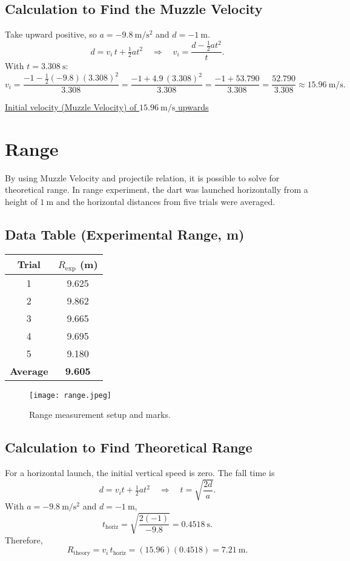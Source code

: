 \documentclass[12pt]{article}
\begin{document}
\subsection{Calculation to Find the Muzzle Velocity}
Take upward positive, so $a=-9.8~\mathrm{m/s^2}$ and $d=-1~\mathrm{m}$.
\[
d = v_i\, t + \tfrac{1}{2} a t^2 \quad \Rightarrow \quad
v_i = \frac{d - \tfrac{1}{2} a t^2}{t}.
\]
With $t=3.308~\mathrm{s}$:
\[
v_i = \frac{-1 - \tfrac{1}{2}(-9.8)(3.308)^2}{3.308}
= \frac{-1 + 4.9\,(3.308)^2}{3.308}
= \frac{-1 + 53.790}{3.308}
= \frac{52.790}{3.308}
\approx \boxed{15.96~\mathrm{m/s}}.
\]
\vspace{1em}

\noindent\hfill\underline{Initial velocity (Muzzle Velocity) of $15.96~\mathrm{m/s}$ upwards}

\newpage
\section{Range}
By using Muzzle Velocity and projectile relation, it is possible to solve for theoretical range. In range experiment, the dart was launched horizontally from a height of $1~\mathrm{m}$ and the horizontal distances from five trials were averaged.

\subsection{Data Table (Experimental Range, m)}
\begin{center}
\begin{tabular}{|c|c|}
\hline
Trial & $R_{\exp}$ (m) \\ \hline
1 & 9.625 \\ \hline
2 & 9.862 \\ \hline
3 & 9.665 \\ \hline
4 & 9.695 \\ \hline
5 & 9.180 \\ \hline
\textbf{Average} & \textbf{9.605} \\ \hline
\end{tabular}
\end{center}

\begin{figure}[H]
  \centering
  \texttt{[image: range.jpeg]}
  \caption*{Range measurement setup and marks.}
\end{figure}

\subsection{Calculation to Find Theoretical Range}
For a horizontal launch, the initial vertical speed is zero. The fall time is
\[
d = v_i t + \tfrac12 a t^2 \quad\Rightarrow\quad
t=\sqrt{\frac{2d}{a}}.
\]
With $a=-9.8~\mathrm{m/s^2}$ and $d=-1~\mathrm{m}$,
\[
t_{\mathrm{horiz}}
=\sqrt{\frac{2(-1)}{-9.8}}=0.4518~\mathrm{s}.
\]
Therefore,
\[
R_{\mathrm{theory}}=v_i\,t_{\mathrm{horiz}}
=(15.96)(0.4518)=\boxed{7.21~\mathrm{m}}.
\]
\end{document}
